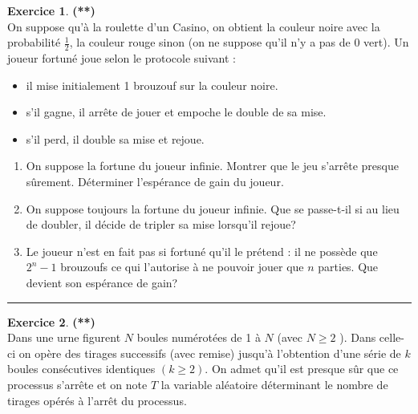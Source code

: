 \documentclass[a4paper,11pt]{article}
\theoremstyle{definition}
\newtheorem{exo}{Exercice} %
\begin{document}
\begin{minipage}{1\linewidth}\begin{minipage}[t]{0.48\linewidth}\raggedright
		
		\begin{exo}\textbf{(**)}\quad\\[0.2cm] %
			On suppose qu'à la roulette d'un Casino, on obtient la couleur noire avec la probabilité $\frac{1}{2}$, la couleur rouge sinon (on ne suppose qu'il n'y a pas de 0 vert). Un joueur fortuné joue selon le protocole suivant :
			
			\begin{itemize}
				\item il mise initialement 1 brouzouf sur la couleur noire.
				\item s'il gagne, il arrête de jouer et empoche le double de sa mise.
				\item s'il perd, il double sa mise et rejoue. 
			\end{itemize}
		
			\begin{enumerate}
				\item On suppose la fortune du joueur infinie. Montrer que le jeu s'arrête presque sûrement. Déterminer l'espérance de gain du joueur.
				\item On suppose toujours la fortune du joueur infinie.	Que se passe-t-il si au lieu de doubler, il décide de tripler sa mise lorsqu'il rejoue?
				\item Le joueur n'est en fait pas si fortuné qu'il le prétend : il ne possède que $2^{n}-1$ brouzoufs ce qui l'autorise à ne pouvoir jouer que $n$ parties. Que devient son espérance de gain?
			\end{enumerate}

			
			\centering\rule{1\linewidth}{0.6pt}\end{exo}
		
		
		
		\begin{exo}\textbf{(**)}\quad\\[0.2cm]
			
			Dans une urne figurent $N$ boules numérotées de 1 à $N$ (avec $N \geq 2$ ). Dans celle-ci on opère des tirages successifs (avec remise) jusqu'à l'obtention d'une série de $k$ boules consécutives identiques $(k \geq 2)$. On admet qu'il est presque sûr que ce processus s'arrête et on note $T$ la variable aléatoire déterminant le nombre de tirages opérés à l'arrêt du processus.
			

\end{exo}
\end{minipage}
\end{minipage}
\end{document}
